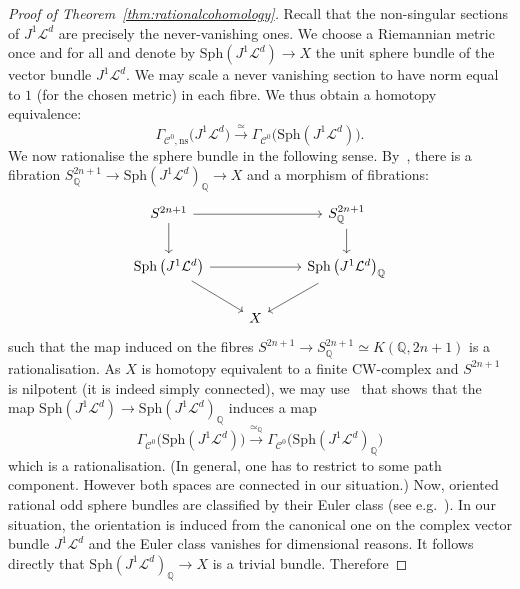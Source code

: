 \documentclass[a4paper]{amsart}
\newcommand{\bQ}{\mathbb Q}
\newcommand{\cC}{\mathcal C}
\newcommand{\cL}{\mathcal L}
\newcommand{\lra}{\longrightarrow}
\newcommand{\Sph}{\mathrm{Sph}}
\theoremstyle{plain}
\theoremstyle{definition}
\begin{document}
\begin{proof}[Proof of Theorem~\ref{thm:rationalcohomology}]
Recall that the non-singular sections of $J^1\cL^d$ are precisely the never-vanishing ones. We choose a Riemannian metric once and for all and denote by $\Sph\left(J^1\cL^d\right) \to X$ the unit sphere bundle of the vector bundle $J^1\cL^d$. We may scale a never vanishing section to have norm equal to $1$ (for the chosen metric) in each fibre. We thus obtain a homotopy equivalence:
\[
    \Gamma_{\cC^0, \text{ns}}\Big(J^1\cL^d\Big) \overset{\simeq}{\lra} \Gamma_{\cC^0}\Big( \Sph\left(J^1\cL^d\right)\Big).
\]
We now rationalise the sphere bundle in the following sense. By~\cite[Theorem 3.2]{llerena_localization_1985}, there is a fibration $S^{2n+1}_\bQ \to \Sph\left(J^1\cL^d\right)_\bQ \to X$ and a morphism of fibrations:
\begin{equation*}
\begin{tikzcd}
S^{2n+1} \arrow[d] \arrow[rr] &   & S^{2n+1}_\bQ \arrow[d] \\
\Sph\left(J^1\cL^d\right) \arrow[rr] \arrow[rd]       &   & \Sph\left(J^1\cL^d\right)_\bQ \arrow[ld]       \\
                              & X &                       
\end{tikzcd}
\end{equation*}
such that the map induced on the fibres $S^{2n+1} \to S^{2n+1}_\bQ \simeq K(\bQ, 2n+1)$ is a rationalisation. As $X$ is homotopy equivalent to a finite CW-complex and $S^{2n+1}$ is nilpotent (it is indeed simply connected), we may use~\cite[Theorem 5.3]{moller_nilpotent_1987} that shows that the map $\Sph\left(J^1\cL^d\right) \to \Sph\left(J^1\cL^d\right)_\bQ$ induces a map 
\[
    \Gamma_{\cC^0}\Big(\Sph\left(J^1\cL^d\right)\Big) \overset{\simeq_\bQ}{\lra} \Gamma_{\cC^0}\Big(\Sph\left(J^1\cL^d\right)_\bQ\Big)
\]
which is a rationalisation. (In general, one has to restrict to some path component. However both spaces are connected in our situation.) Now, oriented rational odd sphere bundles are classified by their Euler class (see e.g.~\cite[II.15.b]{felix_rational_2001}). In our situation, the orientation is induced from the canonical one on the complex vector bundle $J^1\cL^d$ and the Euler class vanishes for dimensional reasons. It follows directly that $\Sph\left(J^1\cL^d\right)_\bQ \to X$ is a trivial bundle. Therefore

\end{proof}
\end{document}
